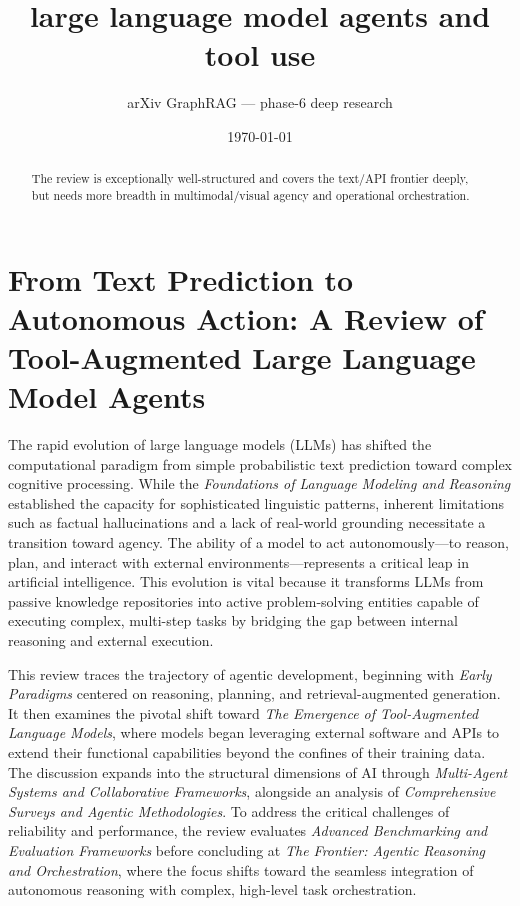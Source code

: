 \documentclass[11pt]{article}
\title{large language model agents and tool use}
\author{arXiv GraphRAG --- phase-6 deep research}
\date{\today}
\begin{document}
\maketitle

\begin{abstract}
The review is exceptionally well-structured and covers the text/API frontier deeply, but needs more breadth in multimodal/visual agency and operational orchestration.
\end{abstract}

\section{From Text Prediction to Autonomous Action: A Review of Tool-Augmented Large Language Model Agents}

The rapid evolution of large language models (LLMs) has shifted the computational paradigm from simple probabilistic text prediction toward complex cognitive processing. While the \textit{Foundations of Language Modeling and Reasoning} established the capacity for sophisticated linguistic patterns, inherent limitations such as factual hallucinations and a lack of real-world grounding necessitate a transition toward agency. The ability of a model to act autonomously—to reason, plan, and interact with external environments—represents a critical leap in artificial intelligence. This evolution is vital because it transforms LLMs from passive knowledge repositories into active problem-solving entities capable of executing complex, multi-step tasks by bridging the gap between internal reasoning and external execution.

This review traces the trajectory of agentic development, beginning with \textit{Early Paradigms} centered on reasoning, planning, and retrieval-augmented generation. It then examines the pivotal shift toward \textit{The Emergence of Tool-Augmented Language Models}, where models began leveraging external software and APIs to extend their functional capabilities beyond the confines of their training data. The discussion expands into the structural dimensions of AI through \textit{Multi-Agent Systems and Collaborative Frameworks}, alongside an analysis of \textit{Comprehensive Surveys and Agentic Methodologies}. To address the critical challenges of reliability and performance, the review evaluates \textit{Advanced Benchmarking and Evaluation Frameworks} before concluding at \textit{The Frontier: Agentic Reasoning and Orchestration}, where the focus shifts toward the seamless integration of autonomous reasoning with complex, high-level task orchestration.
\end{document}
